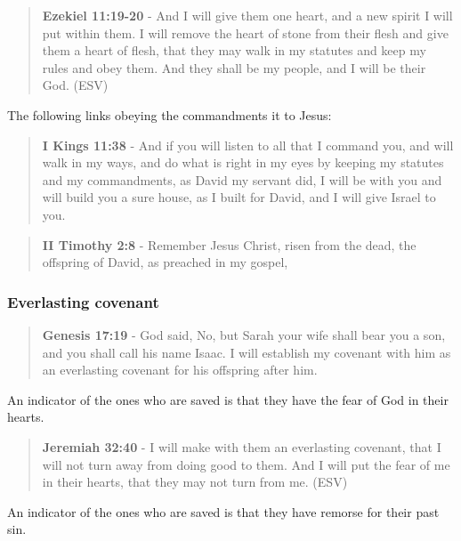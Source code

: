 \documentclass[11pt]{article}
\begin{document}
\begin{quote}
\textbf{Ezekiel 11:19-20} - And I will give them one heart, and a new spirit I will put within them. I will remove the heart of stone from their flesh and give them a heart of flesh, that they may walk in my statutes and keep my rules and obey them. And they shall be my people, and I will be their God. (ESV)
\end{quote}

The following links obeying the commandments it to Jesus:

\begin{quote}
\textbf{I Kings 11:38} - And if you will listen to all that I command you, and will walk in my ways, and do what is right in my eyes by keeping my statutes and my commandments, as David my servant did, I will be with you and will build you a sure house, as I built for David, and I will give Israel to you.
\end{quote}

\begin{quote}
\textbf{II Timothy 2:8} - Remember Jesus Christ, risen from the dead, the offspring of David, as preached in my gospel,
\end{quote}

\subsubsection{Everlasting covenant}
\label{sec:org550e79a}
\begin{quote}
\textbf{Genesis 17:19} - God said, No, but Sarah your wife shall bear you a son, and you shall call his name Isaac. I will establish my covenant with him as an everlasting covenant for his offspring after him.􀧁
\end{quote}

An indicator of the ones who are saved is that they have the fear of God in their hearts.

\begin{quote}
\textbf{Jeremiah 32:40} - I will make with them an everlasting covenant, that I will not turn away from doing good to them. And I will put the fear of me in their hearts, that they may not turn from me. (ESV)
\end{quote}

An indicator of the ones who are saved is that they have remorse for their past sin.
\end{document}
